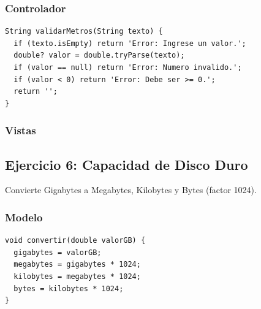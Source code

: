 \documentclass{article}
\begin{document}
\subsubsection{Controlador}
\begin{tcolorbox}[title=Validaciones Ejercicio 5]
\begin{lstlisting}
String validarMetros(String texto) {
  if (texto.isEmpty) return 'Error: Ingrese un valor.';
  double? valor = double.tryParse(texto);
  if (valor == null) return 'Error: Numero invalido.';
  if (valor < 0) return 'Error: Debe ser >= 0.';
  return '';
}
\end{lstlisting}
\end{tcolorbox}

\subsubsection{Vistas}
\begin{figure}[H]
\centering
\begin{minipage}{0.45\textwidth}\centering
\end{minipage}\hfill
\begin{minipage}{0.45\textwidth}\centering
\end{minipage}
\end{figure}

\newpage

\subsection{Ejercicio 6: Capacidad de Disco Duro}
Convierte Gigabytes a Megabytes, Kilobytes y Bytes (factor 1024).

\subsubsection{Modelo}
\begin{tcolorbox}[title=CapacidadDiscoModel]
\begin{lstlisting}
void convertir(double valorGB) {
  gigabytes = valorGB;
  megabytes = gigabytes * 1024;
  kilobytes = megabytes * 1024;
  bytes = kilobytes * 1024;
}
\end{lstlisting}
\end{tcolorbox}
\end{document}
